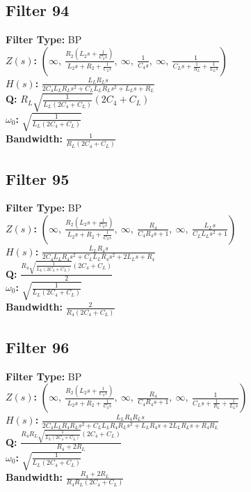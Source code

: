 \documentclass{article}
\begin{document}
\subsection*{Filter 94}
\textbf{Filter Type:} BP \\ 
\textbf{$Z(s)$:} $\left( \infty, \  \frac{R_{2} \left(L_{2} s + \frac{1}{C_{2} s}\right)}{L_{2} s + R_{2} + \frac{1}{C_{2} s}}, \  \infty, \  \frac{1}{C_{4} s}, \  \infty, \  \frac{1}{C_{L} s + \frac{1}{R_{L}} + \frac{1}{L_{L} s}}\right)$ \\ 
\textbf{$H(s)$:} $\frac{L_{L} R_{L} s}{2 C_{4} L_{L} R_{L} s^{2} + C_{L} L_{L} R_{L} s^{2} + L_{L} s + R_{L}}$ \\ 
\textbf{Q:} $R_{L} \sqrt{\frac{1}{L_{L} \left(2 C_{4} + C_{L}\right)}} \left(2 C_{4} + C_{L}\right)$ \\ 
\textbf{$\omega_0$:} $\sqrt{\frac{1}{L_{L} \left(2 C_{4} + C_{L}\right)}}$ \\ 
\textbf{Bandwidth:} $\frac{1}{R_{L} \left(2 C_{4} + C_{L}\right)}$ \\ 
\subsection*{Filter 95}
\textbf{Filter Type:} BP \\ 
\textbf{$Z(s)$:} $\left( \infty, \  \frac{R_{2} \left(L_{2} s + \frac{1}{C_{2} s}\right)}{L_{2} s + R_{2} + \frac{1}{C_{2} s}}, \  \infty, \  \frac{R_{4}}{C_{4} R_{4} s + 1}, \  \infty, \  \frac{L_{L} s}{C_{L} L_{L} s^{2} + 1}\right)$ \\ 
\textbf{$H(s)$:} $\frac{L_{L} R_{4} s}{2 C_{4} L_{L} R_{4} s^{2} + C_{L} L_{L} R_{4} s^{2} + 2 L_{L} s + R_{4}}$ \\ 
\textbf{Q:} $\frac{R_{4} \sqrt{\frac{1}{L_{L} \left(2 C_{4} + C_{L}\right)}} \left(2 C_{4} + C_{L}\right)}{2}$ \\ 
\textbf{$\omega_0$:} $\sqrt{\frac{1}{L_{L} \left(2 C_{4} + C_{L}\right)}}$ \\ 
\textbf{Bandwidth:} $\frac{2}{R_{4} \left(2 C_{4} + C_{L}\right)}$ \\ 
\subsection*{Filter 96}
\textbf{Filter Type:} BP \\ 
\textbf{$Z(s)$:} $\left( \infty, \  \frac{R_{2} \left(L_{2} s + \frac{1}{C_{2} s}\right)}{L_{2} s + R_{2} + \frac{1}{C_{2} s}}, \  \infty, \  \frac{R_{4}}{C_{4} R_{4} s + 1}, \  \infty, \  \frac{1}{C_{L} s + \frac{1}{R_{L}} + \frac{1}{L_{L} s}}\right)$ \\ 
\textbf{$H(s)$:} $\frac{L_{L} R_{4} R_{L} s}{2 C_{4} L_{L} R_{4} R_{L} s^{2} + C_{L} L_{L} R_{4} R_{L} s^{2} + L_{L} R_{4} s + 2 L_{L} R_{L} s + R_{4} R_{L}}$ \\ 
\textbf{Q:} $\frac{R_{4} R_{L} \sqrt{\frac{1}{L_{L} \left(2 C_{4} + C_{L}\right)}} \left(2 C_{4} + C_{L}\right)}{R_{4} + 2 R_{L}}$ \\ 
\textbf{$\omega_0$:} $\sqrt{\frac{1}{L_{L} \left(2 C_{4} + C_{L}\right)}}$ \\ 
\textbf{Bandwidth:} $\frac{R_{4} + 2 R_{L}}{R_{4} R_{L} \left(2 C_{4} + C_{L}\right)}$ \\ 
\end{document}
